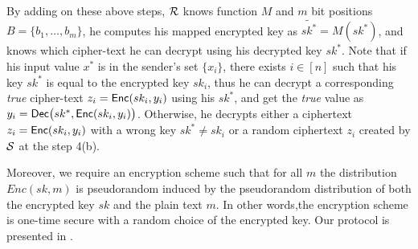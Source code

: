 By adding on these above steps, $\mathcal{R}$ knows function $M$ and $m$ bit positions $B=\{b_1,  \ldots, b_m\}$, he computes his mapped encrypted key as $\tilde{sk^*}=M(sk^*)$, and knows which cipher-text he can decrypt using his decrypted key $sk^*$. Note that if his input value $x^*$  is in the sender's set $\{x_i\}$, there exists $i \in [n]$ such that his key $sk^*$ is equal to the encrypted key $sk_i$, thus he can decrypt a corresponding \textit{true} cipher-text $z_i = \mathsf{Enc}(sk_i,y_i)$ using his $sk^*$, and get the \textit{true} value as $y_i =\mathsf{Dec}\big(sk^*, \mathsf{Enc}(sk_i,y_i)\big)$. Otherwise, he decrypts either a ciphertext $z_i = \mathsf{Enc}(sk_i,y_i)$ with a wrong key $sk^* \neq sk_i$ or a random ciphertext $z_i$ created by $\mathcal{S}$ at the step 4(b).


Moreover, we require an encryption scheme such that for all $m$ the distribution $Enc(sk, m)$  is pseudorandom induced by the pseudorandom distribution of both the encrypted key $sk$ and the plain text $m$.  In other words,the encryption scheme is one-time secure with a random choice of the encrypted key. Our \OPPRF protocol is presented in . 

